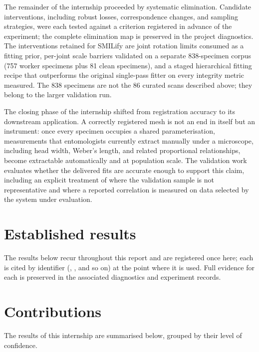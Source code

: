 The remainder of the internship proceeded by systematic elimination.
Candidate interventions, including robust losses, correspondence changes, and
sampling strategies, were each tested against a criterion registered in
advance of the experiment; the complete elimination map is preserved in the
project diagnostics. The interventions retained for SMILify are joint rotation
limits consumed as a fitting prior, per-joint scale barriers validated on a
separate 838-specimen corpus (757 worker specimens plus 81 clean specimens),
and a staged hierarchical fitting recipe that outperforms the original
single-pass fitter on every integrity metric measured. The 838 specimens are
not the 86 curated scans described above; they belong to the larger validation
run.

The closing phase of the internship shifted from registration accuracy to its
downstream application. A correctly registered mesh is not an end in itself
but an instrument: once every specimen occupies a shared parameterisation,
measurements that entomologists currently extract manually under a
microscope, including head width, Weber's length, and related proportional
relationships, become extractable automatically and at population scale.
The validation work evaluates whether the delivered fits are accurate enough
to support this claim, including an explicit treatment of where the validation
sample is not representative and where a reported correlation is measured on
data selected by the system under evaluation.

\section{Established results}
\label{sec:ledger}

The results below recur throughout this report and are registered once here;
each is cited by identifier (, , and so on) at the point where it
is used. Full evidence for each is preserved in the associated diagnostics
and experiment records.

\printfindingledger

\section{Contributions}

The results of this internship are summarised below, grouped by their level of
confidence.

